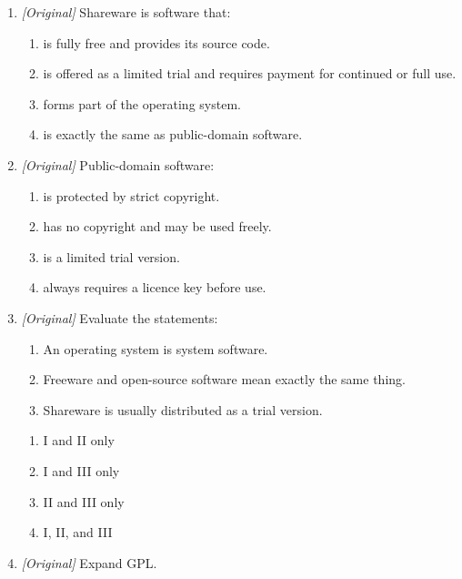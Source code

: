 \documentclass[11pt]{article}
\begin{document}
\begin{enumerate}[label=\textbf{Q\arabic*.}, leftmargin=*]
\begin{enumerate}[label=\Alph*.]
      available.
    \item always includes its full source code.
    \item must be paid for after a fixed trial period.
    \item has no owner and no licence.
  \end{enumerate}
\item \textit{[Original]} Shareware is software that:
  \begin{enumerate}[label=\Alph*.]
    \item is fully free and provides its source code.
    \item is offered as a limited trial and requires payment for continued or
      full use.
    \item forms part of the operating system.
    \item is exactly the same as public-domain software.
  \end{enumerate}
\item \textit{[Original]} Public-domain software:
  \begin{enumerate}[label=\Alph*.]
    \item is protected by strict copyright.
    \item has no copyright and may be used freely.
    \item is a limited trial version.
    \item always requires a licence key before use.
  \end{enumerate}
\item \textit{[Original]} Evaluate the statements:
  \begin{enumerate}[label=\Roman*.]
    \item An operating system is system software.
    \item Freeware and open-source software mean exactly the same thing.
    \item Shareware is usually distributed as a trial version.
  \end{enumerate}
  \begin{enumerate}[label=\Alph*.]
    \item I and II only
    \item I and III only
    \item II and III only
    \item I, II, and III
  \end{enumerate}
\item \textit{[Original]} Expand GPL.
  \begin{enumerate}[label=\Alph*.]

\end{enumerate}
\end{enumerate}
\end{document}

